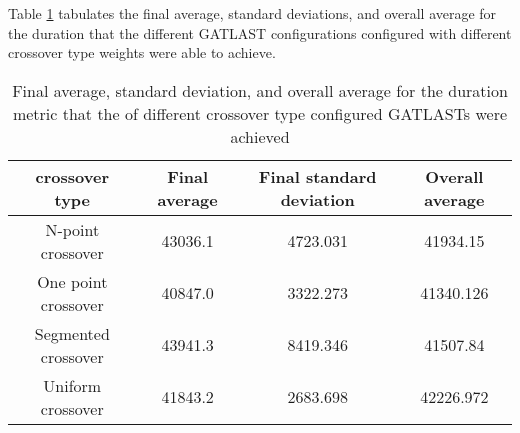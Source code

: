 Table \ref{tab:HP:GA:crossOverType:duration} tabulates the final average, standard deviations, and overall average for the duration that the different GATLAST configurations configured with different crossover type weights were able to achieve.
\begin{table}[tbh!]
\centering
\begin{adjustbox}{trim=0cm 0cm 0cm 0cm, clip=true}
\begin{tabular}{|c|c|c|c|}
\hline
crossover type & Final average & Final standard deviation & Overall average\\
\hline
N-point crossover & 43036.1 & 4723.031 & 41934.15\\\hline
One point crossover & 40847.0 & 3322.273 & 41340.126\\\hline
Segmented crossover & 43941.3 & 8419.346 & 41507.84\\\hline
Uniform crossover & 41843.2 & 2683.698 & 42226.972\\\hline
\end{tabular}
\end{adjustbox}
\caption{Final average, standard deviation, and overall average for the duration metric that the of different crossover type configured GATLASTs were achieved}
\label{tab:HP:GA:crossOverType:duration}
\end{table}